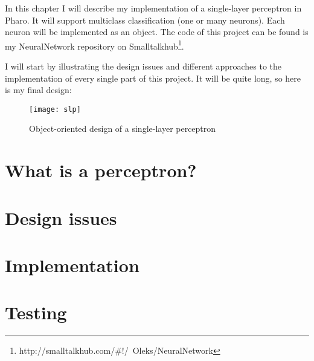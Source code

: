 In this chapter I will describe my implementation of a single-layer perceptron in Pharo. It will support multiclass classification (one or many neurons). Each neuron will be implemented as an object. The code of this project can be found is my NeuralNetwork repository on Smalltalkhub\footnote{http://smalltalkhub.com/\#!/~Oleks/NeuralNetwork}.

I will start by illustrating the design issues and different approaches to the implementation of every single part of this project. It will be quite long, so here is my final design:

\begin{figure}[H]
  \centering
  \texttt{[image: slp]}
  \caption{Object-oriented design of a single-layer perceptron}
  \label{fig:slp1}
\end{figure}

\section{What is a perceptron?}


\section{Design issues}


\section{Implementation}

     
\section{Testing}


